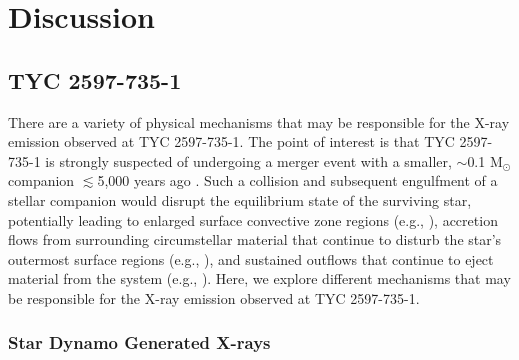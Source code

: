 \documentclass[linenumbers]{aastex631}
\begin{document}
\section{Discussion}  \label{sec:discussion}
\subsection{TYC 2597-735-1}
There are a variety of physical mechanisms that may be responsible for the X-ray emission observed at TYC 2597-735-1. The point of interest is that TYC 2597-735-1 is strongly suspected of undergoing a merger event with a smaller, $\sim$0.1 M$_{\odot}$ companion $\lesssim$5,000 years ago \citep{2020Natur.587..387H}. Such a collision and subsequent engulfment of a stellar companion would disrupt the equilibrium state of the surviving star, potentially leading to enlarged surface convective zone regions (e.g., \citealt{}), accretion flows from surrounding circumstellar material that continue to disturb the star's outermost surface regions (e.g., \citealt{}), and sustained outflows that continue to eject material from the system (e.g., \citealt{Zuckerman+2008}). Here, we explore different mechanisms that may be responsible for the X-ray emission observed at TYC 2597-735-1.

\subsubsection{Star Dynamo Generated X-rays}
\end{document}
